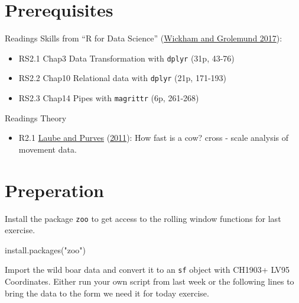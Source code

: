 \documentclass[
]{book}
\newenvironment{Shaded}{\begin{snugshade}}{\end{snugshade}}
\newcommand{\FunctionTok}[1]{\textcolor[rgb]{0.00,0.00,0.00}{#1}}
\newcommand{\NormalTok}[1]{#1}
\newcommand{\StringTok}[1]{\textcolor[rgb]{0.31,0.60,0.02}{#1}}
\providecommand{\tightlist}{%
  \setlength{\itemsep}{0pt}\setlength{\parskip}{0pt}}
\begin{document}
\hypertarget{prerequisites-1}{%
\section{Prerequisites}\label{prerequisites-1}}

Readings Skills from ``R for Data Science'' (\protect\hyperlink{ref-wickham2017}{Wickham and Grolemund 2017}):

\begin{itemize}
\tightlist
\item
  RS2.1 Chap3 Data Transformation with \texttt{dplyr} (31p, 43-76)
\item
  RS2.2 Chap10 Relational data with \texttt{dplyr} (21p, 171-193)
\item
  RS2.3 Chap14 Pipes with \texttt{magrittr} (6p, 261-268)
\end{itemize}

Readings Theory

\begin{itemize}
\tightlist
\item
  R2.1 \protect\hyperlink{ref-laube2011}{Laube and Purves} (\protect\hyperlink{ref-laube2011}{2011}): How fast is a cow? cross - scale analysis of movement data.
\end{itemize}

\hypertarget{preperation-1}{%
\section{Preperation}\label{preperation-1}}

Install the package \texttt{zoo} to get access to the rolling window functions for last exercise.

\begin{Shaded}
\begin{Highlighting}[]
\FunctionTok{install.packages}\NormalTok{(}\StringTok{"zoo"}\NormalTok{)}
\end{Highlighting}
\end{Shaded}

Import the wild boar data and convert it to an \texttt{sf} object with CH1903+ LV95 Coordinates. Either run your own script from last week or the following lines to bring the data to the form we need it for today exercise.
\end{document}
